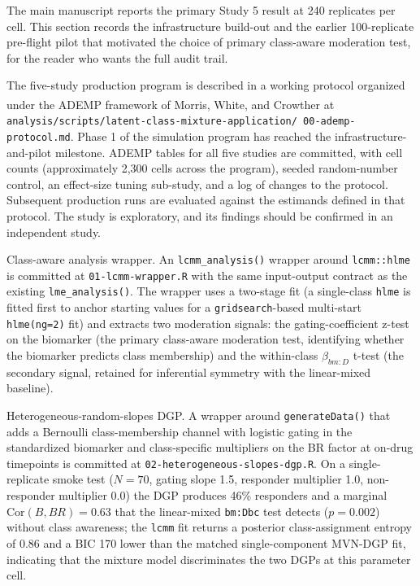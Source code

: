 \documentclass[
  11pt,
]{article}
\begin{document}
The main manuscript reports the primary Study 5 result at 240
replicates per cell. This section records the infrastructure build-out
and the earlier 100-replicate pre-flight pilot that motivated the
choice of primary class-aware moderation test, for the reader who
wants the full audit trail.

The five-study production program is described in a working
protocol organized under the ADEMP framework of Morris, White, and
Crowther\textsuperscript{} at
\texttt{analysis/scripts/latent-class-mixture-application/\ 00-ademp-protocol.md}. Phase 1 of the simulation program has
reached the infrastructure-and-pilot milestone. ADEMP tables for all
five studies are committed, with cell counts (approximately 2,300
cells across the program), seeded random-number control, an
effect-size tuning sub-study, and a log of changes to the protocol.
Subsequent production runs are evaluated against the estimands
defined in that protocol. The study is exploratory, and its findings
should be confirmed in an independent study.

Class-aware analysis wrapper. An \texttt{lcmm\_analysis()} wrapper
around \texttt{lcmm::hlme} is committed at \texttt{01-lcmm-wrapper.R}
with the same input-output contract as the existing
\texttt{lme\_analysis()}. The wrapper uses a two-stage fit (a
single-class \texttt{hlme} is fitted first to anchor starting values
for a \texttt{gridsearch}-based multi-start \texttt{hlme(ng=2)} fit)
and extracts two moderation signals: the gating-coefficient z-test on
the biomarker (the primary class-aware moderation test, identifying
whether the biomarker predicts class membership) and the within-class
\(\beta_{bm:D}\) t-test (the secondary signal, retained for inferential
symmetry with the linear-mixed baseline).

Heterogeneous-random-slopes DGP. A wrapper around \texttt{generateData()}
that adds a Bernoulli class-membership channel with logistic gating in
the standardized biomarker and class-specific multipliers on the BR
factor at on-drug timepoints is committed at
\texttt{02-heterogeneous-slopes-dgp.R}. On a single-replicate smoke
test (\(N = 70\), gating slope 1.5, responder multiplier 1.0,
non-responder multiplier 0.0) the DGP produces 46\% responders and a
marginal \(\mathrm{Cor}(B, BR) = 0.63\) that the linear-mixed
\texttt{bm:Dbc} test detects (\(p = 0.002\)) without class awareness;
the \texttt{lcmm} fit returns a posterior class-assignment entropy of
0.86 and a BIC 170 lower than the matched single-component MVN-DGP
fit, indicating that the mixture model discriminates the two DGPs at
this parameter cell.
\end{document}
